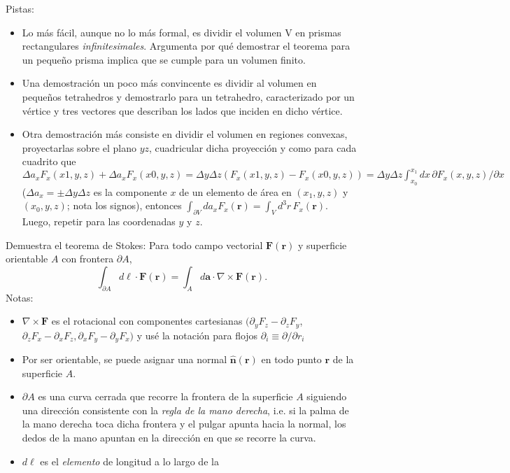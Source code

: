 \documentclass{exam}
\begin{document}
\begin{questions}
  Pistas:
  \begin{itemize}
  \item Lo más fácil, aunque no lo más formal, es dividir el volumen
    V en prismas rectangulares {\em infinitesimales}. Argumenta por qué
    demostrar el teorema para un pequeño prisma implica que se cumple
    para un volumen finito.
  \item   Una demostración un poco más convincente es dividir al volumen en
    pequeños tetrahedros y demostrarlo para un tetrahedro, caracterizado
    por un vértice y tres vectores que describan los lados que inciden
    en dicho vértice.
  \item   Otra demostración más consiste en dividir el volumen en regiones
    convexas, proyectarlas sobre el plano $yz$, cuadricular dicha
    proyección y como para cada cuadrito que $\Delta a_x
    F_x(x1,y,z)+\Delta a_x F_x(x0,y,z)=\Delta y\Delta
    z(F_x(x1,y,z)-F_x(x0,y,z))=\Delta y\Delta z\int_{x_0}^{x_1} dx\,
    \partial F_x(x,y,z)/\partial x$ ($\Delta a_x=\pm\Delta y
    \Delta z$ es la componente $x$ de un elemento de área en $(x_1,y,z)$ y
    $(x_0,y,z)$; nota los signos), entonces $\int_{\partial
      V} da_x F_x(\bm r)=\int_V d^3r\, F_x(\bm r)$. Luego, repetir para
    las coordenadas $y$ y $z$.
  \end{itemize}
  \question Demuestra el teorema de Stokes: Para todo campo vectorial
  $\bm F(\bm r)$ y superficie orientable $A$ con frontera $\partial
  A$,
  $$
  \int_{\partial A}d\bm \ell\cdot\bm F(\bm r)=\int_A d\bm
  a\cdot\nabla\times\bm F(\bm r).
  $$
  Notas:
  \begin{itemize}
  \item $\nabla\times \bm F$ es el rotacional con componentes cartesianas
    $(\partial_yF_z-\partial_zF_y$, $\partial_z F_x-\partial_x F_z,
    \partial_x F_y-\partial_y F_x)$ y usé la notación para flojos
    $\partial_i\equiv\partial/\partial r_i$
  \item Por ser orientable, se puede asignar una normal $\hat
    {\bm n}(\bm r)$ en todo punto $\bm r$ de la superficie $A$.
  \item $\partial A$ es una curva cerrada que recorre la frontera de
    la superficie $A$ siguiendo una dirección consistente con la {\em
      regla de la mano derecha}, i.e. si la palma de la mano derecha
    toca dicha frontera y el pulgar apunta hacia la normal, los dedos de
    la mano apuntan en la dirección en que se recorre la curva.
  \item $d\bm \ell$ es el {\em elemento} de longitud a lo largo de la

\end{itemize}
\end{questions}
\end{document}
